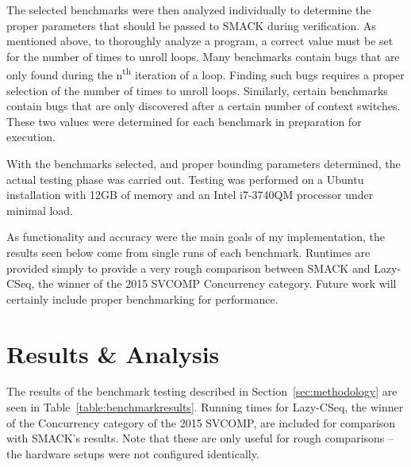 The selected benchmarks were then analyzed individually to determine
the proper parameters that should be passed to SMACK during
verification.  As mentioned above, to thoroughly analyze a program, a
correct value must be set for the number of times to unroll loops.
Many benchmarks contain bugs that are only found during the
n\textsuperscript{th} iteration of a loop.  Finding such bugs requires a
proper selection of the number of times to unroll loops.  Similarly,
certain benchmarks contain bugs that are only discovered after a
certain number of context switches.  These two values were determined
for each benchmark in preparation for execution.

With the benchmarks selected, and proper bounding parameters
determined, the actual testing phase was carried out.  Testing was
performed on a Ubuntu installation with 12GB of memory and an Intel
i7-3740QM processor under minimal load.

As functionality and accuracy were the main goals of my
implementation, the results seen below come from single runs of each
benchmark.  Runtimes are provided simply to provide a very rough
comparison between SMACK and Lazy-CSeq, the winner of the 2015 SVCOMP
Concurrency category.   Future work will certainly include proper
benchmarking for performance. 

\section{Results \& Analysis}
The results of the benchmark testing described in
Section~\ref{sec:methodology} are seen in
Table~\ref{table:benchmarkresults}.  Running times for Lazy-CSeq, the winner 
of the Concurrency category of the 2015 SVCOMP, are included for
comparison with SMACK's results.  Note that these are only useful for
rough comparisons -- the hardware setups were not configured
identically.  

\newcommand{\specialcell}[3][c]{%
  \begin{tabular}[#1]{@{}#2@{}}#3\end{tabular}}

